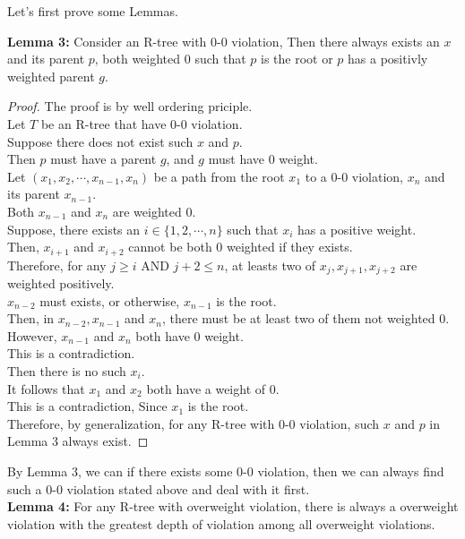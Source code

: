 \documentclass[10pt]{article}
\newcommand{\aand}{\mbox{ AND }}
\begin{document}
\begin{enumerate}
	Let's first prove some Lemmas.

	\textbf{Lemma 3:} Consider an R-tree with 0-0 violation, Then there always exists an $x$ and its parent $p$, both weighted 0 such that $p$ is the root or $p$ has a positivly weighted parent $g$. \\
	\begin{proof}
	The proof is by well ordering priciple. \\
	Let $T$ be an R-tree that have 0-0 violation. \\
	Suppose there does not exist such $x$ and $p$. \\
	Then $p$ must have a parent $g$, and $g$ must have 0 weight. \\
	Let $(x_1, x_2, \cdots, x_{n-1}, x_{n})$ be a path from the root $x_1$ to a 0-0 violation, $x_{n}$ and its parent $x_{n-1}$. \\
	Both $x_{n-1}$ and $x_{n}$ are weighted 0. \\
	Suppose, there exists an $i \in \{1, 2, \cdots, n\}$ such that $x_{i}$ has a positive weight. \\
	Then, $x_{i+1}$ and $x_{i+2}$ cannot be both 0 weighted if they exists. \\
	Therefore, for any $j \geq i \aand j+2 \leq n$, at leasts two of $x_{j}, x_{j+1}, x_{j+2}$ are weighted positively. \\
	$x_{n-2}$ must exists, or otherwise, $x_{n-1}$ is the root. \\
	Then, in $x_{n-2}, x_{n-1}$ and $x_{n}$, there must be at least two of them not weighted 0. \\
	However, $x_{n-1}$ and $x_{n}$ both have 0 weight. \\
	This is a contradiction. \\
	Then there is no such $x_{i}$. \\
	It follows that $x_{1}$ and $x_{2}$ both have a weight of 0. \\
	This is a contradiction, Since $x_{1}$ is the root. \\
	Therefore, by generalization, for any R-tree with 0-0 violation, such $x$ and $p$ in Lemma 3 always exist. 
	\end{proof}

	By Lemma 3, we can if there exists some 0-0 violation, then we can always
	find such a 0-0 violation stated above and deal with it first. \\

	\textbf{Lemma 4:} For any R-tree with overweight violation, there is always
	a overweight violation with the greatest depth of violation among all
	overweight violations. 


\end{enumerate}
\end{document}
